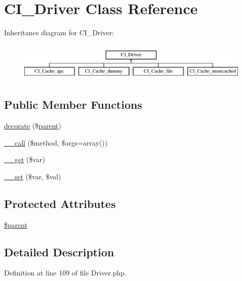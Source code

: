 \hypertarget{class_c_i___driver}{\section{C\-I\-\_\-\-Driver Class Reference}
\label{class_c_i___driver}
}
Inheritance diagram for C\-I\-\_\-\-Driver\-:\begin{figure}[H]
\begin{center}
\leavevmode
\includegraphics[height=1.866667cm]{class_c_i___driver}
\end{center}
\end{figure}
\subsection*{Public Member Functions}
\begin{DoxyCompactItemize}
\item 
\hyperlink{class_c_i___driver_acf6a5ad6a84d4c7a27f463cbb618004b}{decorate} (\$\hyperlink{mathquill_8js_a73c61f8f80bfb4ec7e57a9d4c9d1d738}{parent})
\item 
\hyperlink{class_c_i___driver_a57936fde7f1adea3f3e7dfca474a1786}{\-\_\-\-\_\-call} (\$method, \$args=array())
\item 
\hyperlink{class_c_i___driver_a8fb2d9cdca17b87400e780b9f9720933}{\-\_\-\-\_\-get} (\$var)
\item 
\hyperlink{class_c_i___driver_a921783e9d7c3fb79479375193c9f3d1e}{\-\_\-\-\_\-set} (\$var, \$val)
\end{DoxyCompactItemize}
\subsection*{Protected Attributes}
\begin{DoxyCompactItemize}
\item 
\hyperlink{class_c_i___driver_a4e2313a4b35b72a06ac45fd38960f677}{\$parent}
\end{DoxyCompactItemize}


\subsection{Detailed Description}


Definition at line 109 of file Driver.\-php.



